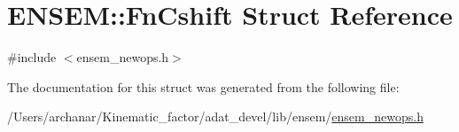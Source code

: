 \hypertarget{structENSEM_1_1FnCshift}{}\section{E\+N\+S\+EM\+:\+:Fn\+Cshift Struct Reference}
\label{structENSEM_1_1FnCshift}


{\ttfamily \#include $<$ensem\+\_\+newops.\+h$>$}



The documentation for this struct was generated from the following file\+:\begin{DoxyCompactItemize}
\item 
/\+Users/archanar/\+Kinematic\+\_\+factor/adat\+\_\+devel/lib/ensem/\mbox{\hyperlink{lib_2ensem_2ensem__newops_8h}{ensem\+\_\+newops.\+h}}\end{DoxyCompactItemize}
